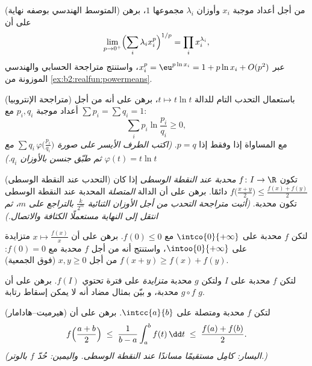 \begin{exercise}[$\star\star$]\label{exo:b2:realfun:6}
(المتوسط الهندسي بوصفه نهاية) من أجل أعداد موجبة $x_i$ وأوزان
$\lambda_i$ مجموعها $1$، برهن على أن
\[
\lim_{p \to 0^+} \Bigl(\sum_i \lambda_i x_i^p\Bigr)^{1/p}
= \prod_i x_i^{\lambda_i} ,
\]
عبر $x_i^p = \eu^{p\ln x_i} = 1 + p\ln x_i + O(p^2)$، واستنتج
متراجحة الحسابي والهندسي الموزونة من
\cref{ex:b2:realfun:powermeans}.
\end{exercise}

\begin{exercise}[$\star\star$]\label{exo:b2:realfun:7}
(متراجحة الإنتروبيا) باستعمال التحدب التام للدالة $t \mapsto t\ln t$،
برهن على أنه من أجل أعداد موجبة $p_i, q_i$ مع $\sum p_i = \sum q_i = 1$:
\[
\sum_i p_i \ln\frac{p_i}{q_i} \geq 0 ,
\]
مع المساواة إذا وفقط إذا $p = q$. \emph{(اكتب الطرف الأيسر على صورة $\sum q_i\,
\varphi\bigl(\frac{p_i}{q_i}\bigr)$ مع $\varphi(t) = t\ln t$ ثم
طبّق جنسن بالأوزان $q_i$.)}
\end{exercise}

\begin{exercise}[$\star\star\star$]\label{exo:b2:realfun:8}
(التحدب عند النقطة الوسطى) تكون $f \colon I \to \R$ \emph{محدبة عند النقطة الوسطى}
إذا كان $f\bigl(\frac{x+y}{2}\bigr) \leq \frac{f(x) + f(y)}{2}$
دائمًا. برهن على أن الدالة \emph{المتصلة} المحدبة عند النقطة الوسطى تكون
محدبة. \emph{(أثبت متراجحة التحدب من أجل الأوزان
الثنائية $\frac{k}{2^m}$ بالتراجع على $m$، ثم انتقل إلى النهاية
مستعملًا الكثافة والاتصال.)}
\end{exercise}

\begin{exercise}[$\star\star\star$]\label{exo:b2:realfun:9}
لتكن $f$ محدبة على $\intco{0}{+\infty}$ مع $f(0) \leq 0$. برهن على
أن $x \mapsto \frac{f(x)}{x}$ متزايدة على
$\intoo{0}{+\infty}$، واستنتج أنه من أجل $f$ محدبة مع $f(0) =
0$: $f(x + y) \geq f(x) + f(y)$ من أجل $x, y \geq 0$
(فوق الجمعية).
\end{exercise}

\begin{exercise}[$\star$]\label{exo:b2:realfun:10}
لتكن $f$ محدبة على $I$ ولتكن $g$ محدبة \emph{متزايدة} على
فترة تحتوي $f(I)$. برهن على أن $g \circ f$ محدبة، و
بيّن بمثال مضاد أنه لا يمكن إسقاط رتابة $g$.
\end{exercise}

\begin{exercise}[$\star\star$]\label{exo:b2:realfun:11}
(هيرميت--هادامار) لتكن $f$ محدبة ومتصلة على
$\intcc{a}{b}$. برهن على أن
\[
f\Bigl(\frac{a+b}{2}\Bigr) \;\leq\; \frac{1}{b -
a}\int_a^b f(t)\,\dd t \;\leq\; \frac{f(a) + f(b)}{2} .
\]
\emph{(اليسار: كامِل مستقيمًا مساندًا عند النقطة الوسطى. واليمين:
حُدّ $f$ بالوتر.)}
\end{exercise}


